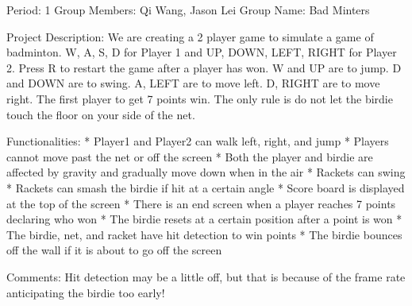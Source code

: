 Period: 1
Group Members: Qi Wang, Jason Lei
Group Name: Bad Minters

Project Description: 
We are creating a 2 player game to simulate a game of badminton.
W, A, S, D for Player 1 and UP, DOWN, LEFT, RIGHT for Player 2.
Press R to restart the game after a player has won.
W and UP are to jump.
D and DOWN are to swing.
A, LEFT are to move left.
D, RIGHT are to move right.
The first player to get 7 points win. 
The only rule is do not let the birdie touch the floor on your side of the net. 

Functionalities:
* Player1 and Player2 can walk left, right, and jump
* Players cannot move past the net or off the screen
* Both the player and birdie are affected by gravity and gradually move down when in the air
* Rackets can swing
* Rackets can smash the birdie if hit at a certain angle
* Score board is displayed at the top of the screen
* There is an end screen when a player reaches 7 points declaring who won
* The birdie resets at a certain position after a point is won
* The birdie, net, and racket have hit detection to win points
* The birdie bounces off the wall if it is about to go off the screen

Comments:
Hit detection may be a little off, but that is because of the frame rate anticipating the birdie too early!


